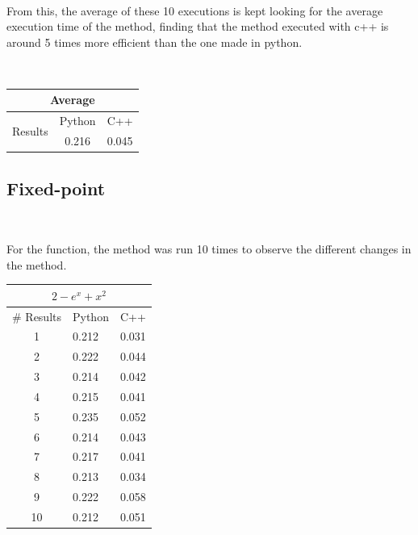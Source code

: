 \documentclass[conference]{IEEEtran}
\begin{document}
\





From this, the average of these 10 executions is kept looking for the average execution time of the method, finding that the method executed with c++ is around 5 times more efficient than the one made in python.

\


\begin{tabular}{|c|c|c|}
\hline
\multicolumn{3}{|c|}{Average}             \\ \hline
\multirow{2}{*}{Results} & Python & C++   \\ \cline{2-3} 
                         & 0.216  & 0.045 \\ \hline
\end{tabular}




\subsection{Fixed-point}

\

For the function, the method was run 10 times to observe the different changes in the method.



\begin{tabular}{|c|l|l}
\hline
\multicolumn{3}{|c|}{\(2 - e^x + x ^2\)}     \\ \hline
\# Results & \multicolumn{1}{c|}{Python} & \multicolumn{1}{c|}{C++}   \\ \hline
1                        & 0.212               & \multicolumn{1}{c|}{0.031}              \\ \hline
2                        & 0.222               & \multicolumn{1}{c|}{0.044}              \\ \hline
3                        & 0.214               & \multicolumn{1}{c|}{0.042}              \\ \hline
4                        & 0.215               & \multicolumn{1}{c|}{0.041}              \\ \hline
5                        & 0.235               & \multicolumn{1}{c|}{0.052}              \\ \hline
6                        & 0.214               & \multicolumn{1}{c|}{0.043}              \\ \hline
7                        & 0.217               & \multicolumn{1}{c|}{0.041}              \\ \hline
8                        & 0.213               & \multicolumn{1}{c|}{0.034}              \\ \hline
9                        & 0.222               & \multicolumn{1}{c|}{0.058}              \\ \hline
10                       & 0.212               & \multicolumn{1}{c|}{0.051}              \\ \hline
\end{tabular}
\end{document}
